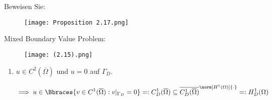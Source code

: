 \pagebreak
\begin{exercise}
Beweisen Sie:
\FloatBarrier
\begin{figure}[h!]
    \centering
    \texttt{[image: Proposition 2.17.png]}
\end{figure}
\FloatBarrier

\end{exercise}


\begin{solution}

Mixed Boundary Value Problem:



\begin{figure}[h!]
    \centering
    \texttt{[image: (2.15).png]}
\end{figure}

\begin{enumerate}[label = (\roman*)]

    \item $u \in C^2(\overline{\Omega})$ und $u = 0$ auf $\Gamma_D$.

    \begin{align*}
        \implies
        u
        \in
        \Bbraces{v \in C^1(\overline{\Omega}): v|_{\Gamma_D} = 0}
        =:
        C_D^1(\overline{\Omega})
        \subseteq
        \overline
        {
            C_D^1(\overline{\Omega})
        }^{
            \norm[H^1(\Omega)]{\cdot}
        }
        =:
        H^1_D(\Omega)
    \end{align*}



\end{enumerate}
\end{solution}
